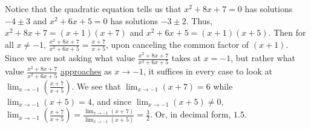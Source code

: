 \documentclass{ximera}
\begin{document}
\begin{exercise}
\begin{hint}
     Notice that the quadratic equation tells us that $x^2+8x+7=0$ has solutions $-4\pm3$ and $x^2+6x+5=0$ has solutions $-3\pm{2}$. Thus, $x^2+8x+7=\left(x+1\right)\left(x+7\right)$ and $x^2+6x+5=\left(x+1\right)\left(x+5\right)$. Then for all $x\ne-1$, $\frac{x^2+8x+7}{x^2+6x+5}=\frac{x+7}{x+5}$, upon canceling the common factor of $\left({x+1}\right)$. Since we are not asking what value $\frac{x^2+8x+7}{x^2+6x+5}$ takes at $x=-1$, but rather what value $\frac{x^2+8x+7}{x^2+6x+5}$ \underline{approaches} as $x\to-1$, it suffices in every case to look at $\lim_{x\to-1}\left({\frac{x+7}{x+5}}\right)$. We see that $\lim_{x\to-1}\left({x+7}\right)=6$ while $\lim_{x\to-1}\left({x+5}\right)=4$, and since $\lim_{x\to-1}\left({x+5}\right)\ne0$, $\lim_{x\to-1}\left({\frac{x+7}{x+5}}\right)=\frac{\lim_{x\to-1}\left({x+7}\right)}{\lim_{x\to-1}\left({x+5}\right)}=\frac{3}{2}$. Or, in decimal form, $1.5$.
    \end{hint}
\end{exercise}
\end{document}
